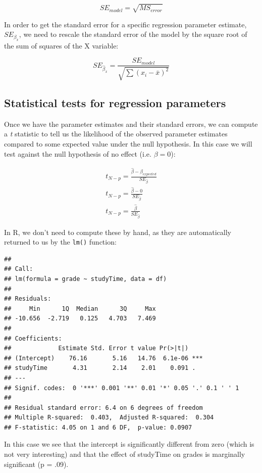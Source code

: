\documentclass[12pt,]{book}
\theoremstyle{definition}
\theoremstyle{definition}
\theoremstyle{definition}
\theoremstyle{remark}
\begin{document}
\[
SE_{model} = \sqrt{MS_{error}}
\]

In order to get the standard error for a specific regression parameter estimate, \(SE_{\beta_x}\), we need to rescale the standard error of the model by the square root of the sum of squares of the X variable:

\[
SE_{\hat{\beta}_x} = \frac{SE_{model}}{\sqrt{{\sum{(x_i - \bar{x})^2}}}}
\]

\hypertarget{statistical-tests-for-regression-parameters}{%
\subsection{Statistical tests for regression parameters}\label{statistical-tests-for-regression-parameters}}

Once we have the parameter estimates and their standard errors, we can compute a \emph{t} statistic to tell us the likelihood of the observed parameter estimates compared to some expected value under the null hypothesis. In this case we will test against the null hypothesis of no effect (i.e. \(\beta=0\)):

\[
\begin{array}{c}
t_{N - p} = \frac{\hat{\beta} - \beta_{expected}}{SE_{\hat{\beta}}}\\
t_{N - p} = \frac{\hat{\beta} - 0}{SE_{\hat{\beta}}}\\
t_{N - p} = \frac{\hat{\beta} }{SE_{\hat{\beta}}}
\end{array}
\]

In R, we don't need to compute these by hand, as they are automatically returned to us by the \texttt{lm()} function:

\begin{verbatim}
## 
## Call:
## lm(formula = grade ~ studyTime, data = df)
## 
## Residuals:
##     Min      1Q  Median      3Q     Max 
## -10.656  -2.719   0.125   4.703   7.469 
## 
## Coefficients:
##             Estimate Std. Error t value Pr(>|t|)    
## (Intercept)    76.16       5.16   14.76  6.1e-06 ***
## studyTime       4.31       2.14    2.01    0.091 .  
## ---
## Signif. codes:  0 '***' 0.001 '**' 0.01 '*' 0.05 '.' 0.1 ' ' 1
## 
## Residual standard error: 6.4 on 6 degrees of freedom
## Multiple R-squared:  0.403,  Adjusted R-squared:  0.304 
## F-statistic: 4.05 on 1 and 6 DF,  p-value: 0.0907
\end{verbatim}

In this case we see that the intercept is significantly different from zero (which is not very interesting) and that the effect of studyTime on grades is marginally significant (p = .09).
\end{document}
